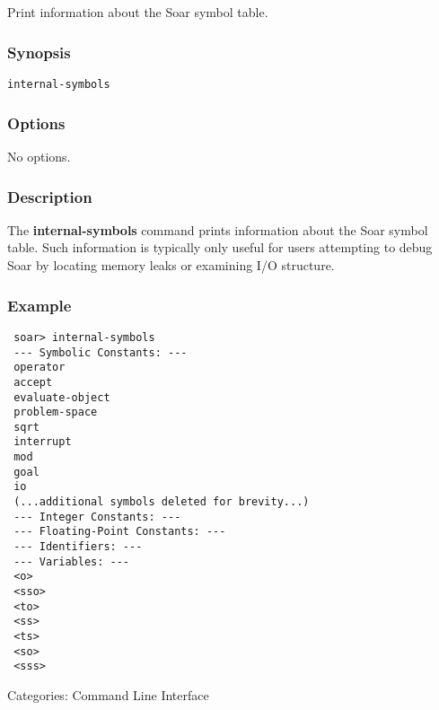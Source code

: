 \subsection{}
\label{internal-symbols}
Print information about the Soar symbol table. 
\subsubsection*{Synopsis}
\begin{verbatim}
internal-symbols
\end{verbatim}
\subsubsection*{Options}
 No options. 
\subsubsection*{Description}
 The \textbf{internal-symbols}
 command prints information about the Soar symbol table. Such information is typically only useful for users attempting to debug Soar by locating memory leaks or examining I/O structure. 
\subsubsection*{Example}
\begin{verbatim}
 soar> internal-symbols
 --- Symbolic Constants: ---
 operator
 accept
 evaluate-object
 problem-space
 sqrt
 interrupt
 mod
 goal
 io
 (...additional symbols deleted for brevity...)
 --- Integer Constants: ---
 --- Floating-Point Constants: ---
 --- Identifiers: ---
 --- Variables: ---  
 <o>
 <sso>
 <to>
 <ss>
 <ts>
 <so>
 <sss>
\end{verbatim}
 Categories: Command Line Interface
